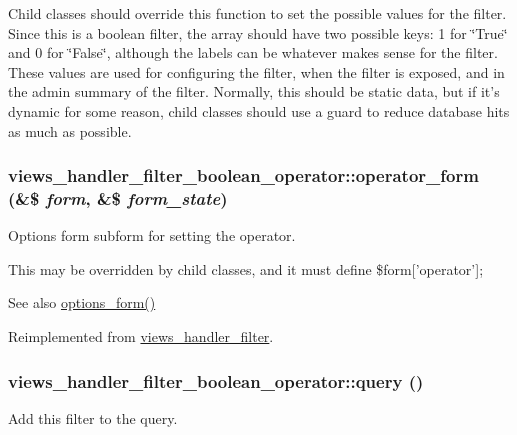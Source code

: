 Child classes should override this function to set the possible values for the filter. Since this is a boolean filter, the array should have two possible keys: 1 for \char`\"{}True\char`\"{} and 0 for \char`\"{}False\char`\"{}, although the labels can be whatever makes sense for the filter. These values are used for configuring the filter, when the filter is exposed, and in the admin summary of the filter. Normally, this should be static data, but if it's dynamic for some reason, child classes should use a guard to reduce database hits as much as possible. \hypertarget{classviews__handler__filter__boolean__operator_a2b8c0523843b8f24144bf5a59254cdd9}{
\subsubsection[{operator\_\-form}]{\setlength{\rightskip}{0pt plus 5cm}views\_\-handler\_\-filter\_\-boolean\_\-operator::operator\_\-form (\&\$ {\em form}, \/  \&\$ {\em form\_\-state})}}
\label{classviews__handler__filter__boolean__operator_a2b8c0523843b8f24144bf5a59254cdd9}
Options form subform for setting the operator.

This may be overridden by child classes, and it must define \$form\mbox{[}'operator'\mbox{]};

\begin{DoxySeeAlso}{See also}
\hyperlink{classviews__handler__filter_af14c69367162057a32709a6340de0988}{options\_\-form()} 
\end{DoxySeeAlso}


Reimplemented from \hyperlink{classviews__handler__filter_a8c77c0a8bba8c3ceceae8950fc7b1121}{views\_\-handler\_\-filter}.\hypertarget{classviews__handler__filter__boolean__operator_ab3afc650701939c060e684d75fa2b21b}{
\subsubsection[{query}]{\setlength{\rightskip}{0pt plus 5cm}views\_\-handler\_\-filter\_\-boolean\_\-operator::query ()}}
\label{classviews__handler__filter__boolean__operator_ab3afc650701939c060e684d75fa2b21b}
Add this filter to the query.


